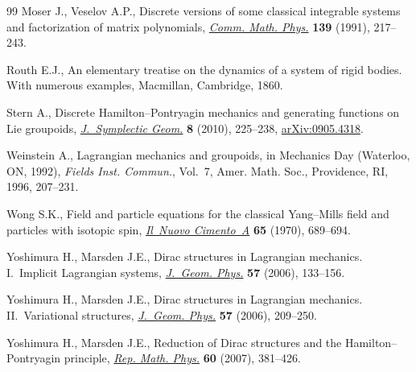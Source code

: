 \documentclass[pdftex]{sigma}
\numberwithin{equation}{section}
\begin{document}
\begin{thebibliography}{99}
Moser J., Veselov A.P., Discrete versions of some classical integrable systems
 and factorization of matrix polynomials, \href{https://doi.org/10.1007/BF02352494}{\textit{Comm. Math. Phys.}}
 \textbf{139} (1991), 217--243.

Routh E.J., An elementary treatise on the dynamics of a system of rigid bodies.
 With numerous examples, Macmillan, Cambridge, 1860.

Stern A., Discrete {H}amilton--{P}ontryagin mechanics and generating functions
 on {L}ie groupoids, \href{https://doi.org/10.4310/JSG.2010.v8.n2.a5}{\textit{J.~Symplectic Geom.}} \textbf{8} (2010), 225--238,
 \href{http://arxiv.org/abs/0905.4318}{arXiv:0905.4318}.

Weinstein A., Lagrangian mechanics and groupoids, in Mechanics Day ({W}aterloo,
 {ON}, 1992), \textit{Fields Inst. Commun.}, Vol.~7, Amer. Math. Soc.,
 Providence, RI, 1996, 207--231.

Wong S.K., Field and particle equations for the classical {Y}ang--{M}ills f\/ield
 and particles with isotopic spin, \href{https://doi.org/10.1007/BF02892134}{\textit{Il~Nuovo Cimento~A}} \textbf{65}
 (1970), 689--694.

Yoshimura H., Marsden J.E., Dirac structures in {L}agrangian mechanics.
 {I}.~{I}mplicit {L}agrangian systems, \href{https://doi.org/10.1016/j.geomphys.2006.02.009}{\textit{J.~Geom. Phys.}} \textbf{57}
 (2006), 133--156.

Yoshimura H., Marsden J.E., Dirac structures in {L}agrangian mechanics.
 {II}.~{V}ariational structures, \href{https://doi.org/10.1016/j.geomphys.2006.02.012}{\textit{J.~Geom. Phys.}} \textbf{57} (2006),
 209--250.

Yoshimura H., Marsden J.E., Reduction of {D}irac structures and the {H}amilton--{P}ontryagin principle, \href{https://doi.org/10.1016/S0034-4877(08)00004-9}{\textit{Rep. Math. Phys.}} \textbf{60}
 (2007), 381--426.

\end{thebibliography}\LastPageEnding
\end{document}
